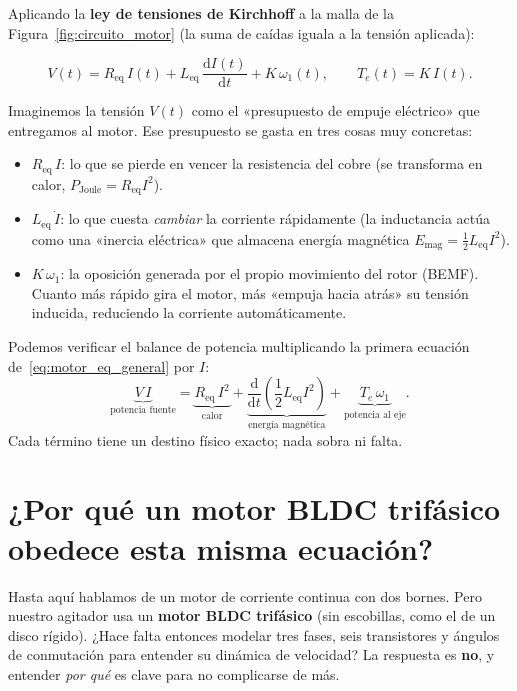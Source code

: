 \documentclass[11pt,a4paper,oneside]{book}
\newcommand{\dd}{\mathrm{d}}
\begin{document}
Aplicando la \textbf{ley de tensiones de Kirchhoff} a la malla de la
Figura~\ref{fig:circuito_motor} (la suma de caídas iguala a la tensión aplicada):
\begin{ecuacionclave}
\begin{equation}
  V(t) = R_{\text{eq}}\,I(t) + L_{\text{eq}}\,\frac{\dd I(t)}{\dd t} + K\,\omega_1(t),
  \qquad
  T_e(t) = K\,I(t).
  \label{eq:motor_eq_general}
\end{equation}
\end{ecuacionclave}

\begin{lectura}
Imaginemos la tensión $V(t)$ como el «presupuesto de empuje eléctrico» que
entregamos al motor. Ese presupuesto se gasta en tres cosas muy concretas:
\begin{itemize}
  \item $R_{\text{eq}}\,I$: lo que se pierde en vencer la resistencia del cobre
        (se transforma en calor, $P_{\text{Joule}} = R_{\text{eq}} I^2$).
  \item $L_{\text{eq}}\,\dot I$: lo que cuesta \emph{cambiar} la corriente
        rápidamente (la inductancia actúa como una «inercia eléctrica» que
        almacena energía magnética $E_{\text{mag}} = \tfrac{1}{2}L_{\text{eq}}I^2$).
  \item $K\,\omega_1$: la oposición generada por el propio movimiento del rotor
        (BEMF). Cuanto más rápido gira el motor, más «empuja hacia atrás» su
        tensión inducida, reduciendo la corriente automáticamente.
\end{itemize}
Podemos verificar el balance de potencia multiplicando la primera ecuación
de~\eqref{eq:motor_eq_general} por $I$:
\[
  \underbrace{V\,I}_{\text{potencia fuente}}
  = \underbrace{R_{\text{eq}}\,I^2}_{\text{calor}}
  + \underbrace{\frac{\dd}{\dd t}\!\left(\frac{1}{2}L_{\text{eq}} I^2\right)}_{\text{energía magnética}}
  + \underbrace{T_e\,\omega_1}_{\text{potencia al eje}}.
\]
Cada término tiene un destino físico exacto; nada sobra ni falta.
\end{lectura}

\section{¿Por qué un motor BLDC trifásico obedece esta misma ecuación?}

Hasta aquí hablamos de un motor de corriente continua con dos bornes. Pero
nuestro agitador usa un \textbf{motor BLDC trifásico} (sin escobillas, como el
de un disco rígido). ¿Hace falta entonces modelar tres fases, seis transistores
y ángulos de conmutación para entender su dinámica de velocidad? La respuesta es
\textbf{no}, y entender \emph{por qué} es clave para no complicarse de más.
\end{document}
